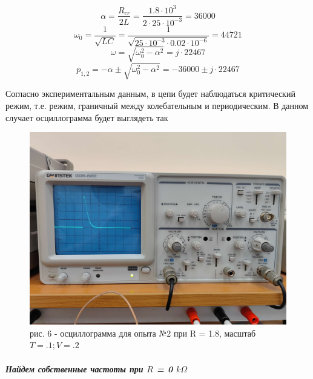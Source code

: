 \documentclass[a4paper,12pt]{report}
\begin{document}
\begin{flushleft}
\[ \alpha = \frac{R_{cr}}{2L} = \frac{1.8\cdot 10^3}{2\cdot 25\cdot 10^{-3}} = 36000 \]
\[ \omega_0 = \frac{1}{\sqrt{LC}} = \frac{1}{\sqrt{25\cdot 10^{-3}\cdot 0.02\cdot 10^{-6}}} = 44721 \]
\[ \omega = \sqrt{\omega_0^2 - \alpha^2} = j \cdot 22467 \]
\[ p_{1,2} = -\alpha \pm \sqrt{\omega_0^2 - \alpha^2} = -36000 \pm j\cdot 22467 \]
\par Согласно экспериментальным данным, в цепи будет наблюдаться критический режим, т.е. режим, граничный между колебательным и периодическим. В данном случает осциллограмма будет выглядеть так
\begin{figure}[h!]
  \includegraphics[width=1\textwidth]{graph4.jpg}
  \label{ris:image6}
  рис. 6 - осциллограмма для опыта №2 при R = 1.8, масштаб $T = .1; V = .2$
\end{figure}

\newpage
\subparagraph*{Найдем собственные частоты при $R$ = 0 $k\Omega$}


\end{flushleft}
\end{document}
